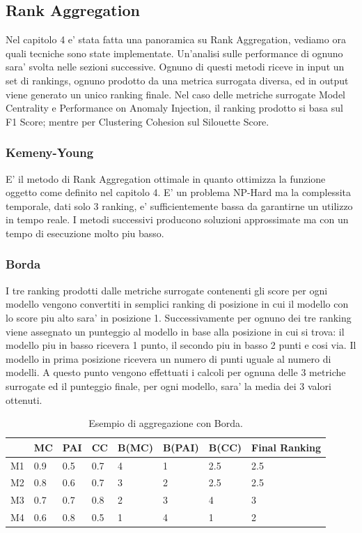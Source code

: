 \subsection{Rank Aggregation}
Nel capitolo 4 e' stata fatta una panoramica su Rank Aggregation, vediamo ora quali tecniche sono state implementate. Un'analisi sulle performance di ognuno sara' svolta nelle sezioni successive.
Ognuno di questi metodi riceve in input un set di rankings, ognuno prodotto da una metrica surrogata diversa, ed in output viene generato un unico ranking finale.
Nel caso delle metriche surrogate Model Centrality e Performance on Anomaly Injection, il ranking prodotto si basa sul F1 Score; mentre per Clustering Cohesion sul Silouette Score.
\subsubsection{Kemeny-Young}
E' il metodo di Rank Aggregation ottimale in quanto ottimizza la funzione oggetto come definito nel capitolo 4. E' un problema NP-Hard ma la complessita temporale, dati solo 3 ranking, e' sufficientemente bassa da garantirne un utilizzo in tempo reale. I metodi successivi producono soluzioni approssimate ma con un tempo di esecuzione molto piu basso.
\subsubsection{Borda}
I tre ranking prodotti dalle metriche surrogate contenenti gli score per ogni modello vengono convertiti in semplici ranking di posizione in cui il modello con lo score piu alto sara' in posizione 1. Successivamente per ognuno dei tre ranking viene assegnato un punteggio al modello in base alla posizione in cui si trova: il modello piu in basso ricevera 1 punto, il secondo piu in basso 2 punti e cosi via. Il modello in prima posizione ricevera un numero di punti uguale al numero di modelli. A questo punto vengono effettuati i calcoli per ognuna delle 3 metriche surrogate ed il punteggio finale, per ogni modello, sara' la media dei 3 valori ottenuti.

\begin{table}

    \centering
    \begin{tabular}{|l|l|l|l|l|l|l|l|}
    	\hline
    	   & MC  & PAI & CC  & B(MC) & B(PAI) & B(CC) & Final Ranking \\ \hline
    	M1 & 0.9 & 0.5 & 0.7 & 4     & 1      & 2.5   & 2.5           \\ \hline
    	M2 & 0.8 & 0.6 & 0.7 & 3     & 2      & 2.5   & 2.5           \\ \hline
    	M3 & 0.7 & 0.7 & 0.8 & 2     & 3      & 4     & 3             \\ \hline
    	M4 & 0.6 & 0.8 & 0.5 & 1     & 4      & 1     & 2             \\ \hline
    \end{tabular}
    \caption{\label{borda}Esempio di aggregazione con Borda.}
\end{table}


